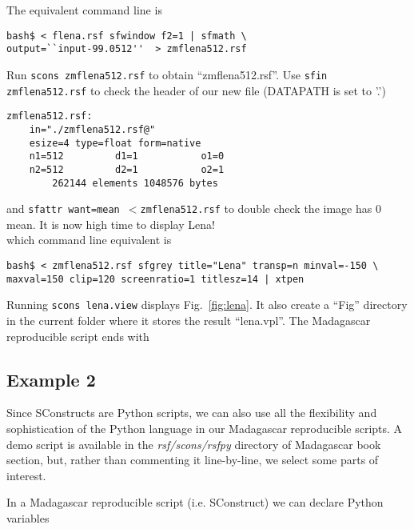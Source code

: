 
%
The equivalent command line is
%
\begin{verbatim}
bash$ < flena.rsf sfwindow f2=1 | sfmath \ 
output=``input-99.0512''  > zmflena512.rsf
\end{verbatim}
%
Run \texttt{scons zmflena512.rsf} to obtain ``zmflena512.rsf''. Use
\texttt{sfin zmflena512.rsf} to check the header of our new file
(DATAPATH is set to '.')
%
\begin{verbatim}
zmflena512.rsf:
    in="./zmflena512.rsf@"
    esize=4 type=float form=native 
    n1=512         d1=1           o1=0          
    n2=512         d2=1           o2=1          
        262144 elements 1048576 bytes
\end{verbatim}
%
and \texttt{sfattr want=mean $<$zmflena512.rsf} to double check the
image has 0 mean. It is now high time to display Lena!\\
%

%
which command line equivalent is
\begin{verbatim}
bash$ < zmflena512.rsf sfgrey title="Lena" transp=n minval=-150 \
maxval=150 clip=120 screenratio=1 titlesz=14 | xtpen
\end{verbatim}
%
Running \texttt{scons lena.view} displays Fig.~\ref{fig:lena}.
%
\inputdir{easystart}
%
It also create a ``Fig'' directory in the current folder where it
stores the result ``lena.vpl''. The Madagascar reproducible script
ends with\\
%


\subsection{Example 2}

Since SConstructs are Python scripts, we can also use all the
flexibility and sophistication of the Python language in our
Madagascar reproducible scripts. A demo script is available in the
\textit{rsf/scons/rsfpy} directory of Madagascar book section, but,
rather than commenting it line-by-line, we select some parts of
interest.

In a Madagascar reproducible script (i.e. SConstruct) we can declare
Python variables\\




